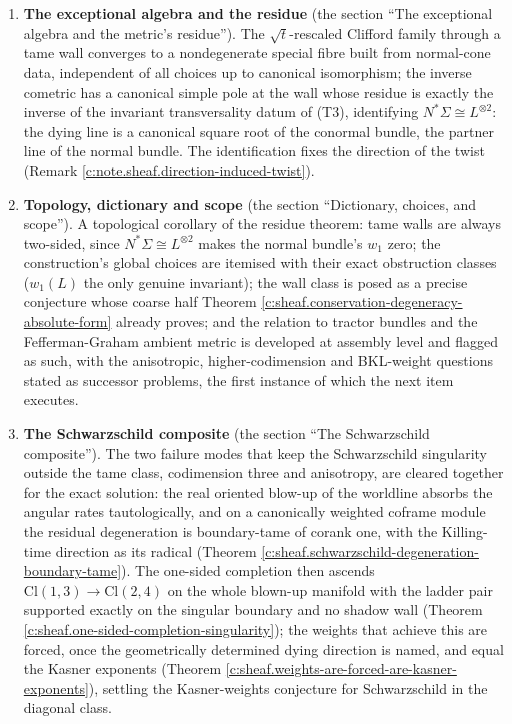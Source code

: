 \documentclass[11pt]{article}
\theoremstyle{definition}
\theoremstyle{plain}
\providecommand{\Cl}{}\renewcommand{\Cl}{\mathrm{Cl}}
\providecommand{\Sig}{}\renewcommand{\Sig}{\Sigma}
\providecommand{\shL}{}\renewcommand{\shL}{L}
\begin{document}
\begin{enumerate}
\item \textbf{The exceptional algebra and the residue} (the section ``The exceptional algebra and the metric's residue''). The $\sqrt{t}$-rescaled Clifford family through a tame wall converges to a nondegenerate special fibre built from normal-cone data, independent of all choices up to canonical isomorphism; the inverse cometric has a canonical simple pole at the wall whose residue is exactly the inverse of the invariant transversality datum of (T3), identifying $N^*\Sig \cong \shL^{\otimes 2}$: the dying line is a canonical square root of the conormal bundle, the partner line of the normal bundle. The identification fixes the direction of the twist (Remark \ref{c:note.sheaf.direction-induced-twist}).
\item \textbf{Topology, dictionary and scope} (the section ``Dictionary, choices, and scope''). A topological corollary of the residue theorem: tame walls are always two-sided, since $N^*\Sig \cong \shL^{\otimes 2}$ makes the normal bundle's $w_1$ zero; the construction's global choices are itemised with their exact obstruction classes ($w_1(\shL)$ the only genuine invariant); the wall class is posed as a precise conjecture whose coarse half Theorem \ref{c:sheaf.conservation-degeneracy-absolute-form} already proves; and the relation to tractor bundles and the Fefferman-Graham ambient metric is developed at assembly level and flagged as such, with the anisotropic, higher-codimension and BKL-weight questions stated as successor problems, the first instance of which the next item executes.
\item \textbf{The Schwarzschild composite} (the section ``The Schwarzschild composite''). The two failure modes that keep the Schwarzschild singularity outside the tame class, codimension three and anisotropy, are cleared together for the exact solution: the real oriented blow-up of the worldline absorbs the angular rates tautologically, and on a canonically weighted coframe module the residual degeneration is boundary-tame of corank one, with the Killing-time direction as its radical (Theorem \ref{c:sheaf.schwarzschild-degeneration-boundary-tame}). The one-sided completion then ascends $\Cl(1,3) \to \Cl(2,4)$ on the whole blown-up manifold with the ladder pair supported exactly on the singular boundary and no shadow wall (Theorem \ref{c:sheaf.one-sided-completion-singularity}); the weights that achieve this are forced, once the geometrically determined dying direction is named, and equal the Kasner exponents (Theorem \ref{c:sheaf.weights-are-forced-are-kasner-exponents}), settling the Kasner-weights conjecture for Schwarzschild in the diagonal class.

\end{enumerate}
\end{document}
